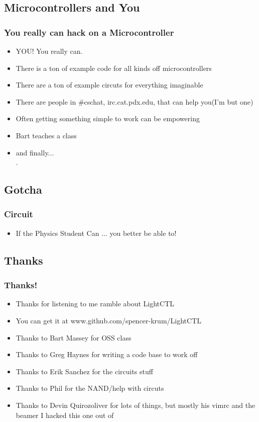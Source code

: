 \documentclass{beamer}
\begin{document}
\subsection{Microcontrollers and You}
\frame
{
	\frametitle{You really can hack on a Microcontroller}
	\begin{itemize}
		\item YOU! You really can.
		\item There is a ton of example code for all kinds off microcontrollers
		\item There are a ton of example circuts for everything imaginable
		\item There are people in \#cschat, irc.cat.pdx.edu, that can help you(I'm but one)
		\item Often getting something simple to work can be empowering
		\item Bart teaches a class
		\item and finally... \\.
	\end{itemize}
}


\subsection{Gotcha}
\frame
{
	\frametitle{Circuit}
	\begin{itemize}
		\item If the Physics Student Can ... you better be able to!
	\end{itemize}
}
\subsection{Thanks}
\frame
{
	\frametitle{Thanks!}
	\begin{itemize}
		\item Thanks for listening to me ramble about LightCTL
		\item You can get it at www.github.com/spencer-krum/LightCTL
		\item Thanks to Bart Massey for OSS class
		\item Thanks to Greg Haynes for writing a code base to work off
		\item Thanks to Erik Sanchez for the circuits stuff
		\item Thanks to Phil for the NAND/help with circuts
		\item Thanks to Devin Quirozoliver for lots of things, but mostly his vimrc and the beamer I hacked this one out of
	\end{itemize}
}
\end{document}
